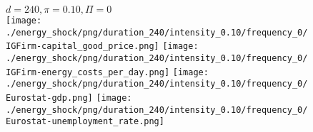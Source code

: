 \begin{figure}[ht!]
\centering\leavevmode
\begin{minipage}{17cm}
\centering\leavevmode
{$d=240, \pi=0.10, \Pi=0$}\\
\texttt{[image: ./energy\_shock/png/duration\_240/intensity\_0.10/frequency\_0/IGFirm-capital\_good\_price.png]}
\texttt{[image: ./energy\_shock/png/duration\_240/intensity\_0.10/frequency\_0/IGFirm-energy\_costs\_per\_day.png]}
\texttt{[image: ./energy\_shock/png/duration\_240/intensity\_0.10/frequency\_0/Eurostat-gdp.png]}
\texttt{[image: ./energy\_shock/png/duration\_240/intensity\_0.10/frequency\_0/Eurostat-unemployment\_rate.png]}
\end{minipage}
\end{figure}

